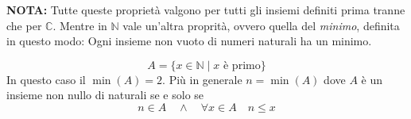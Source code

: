 \textbf{NOTA:} Tutte queste propriet\`a valgono per tutti gli insiemi definiti prima tranne che per $\mathbb{C}$. Mentre
in $\mathbb{N}$ vale un'altra proprit\`a, ovvero quella del \emph{minimo}, definita in questo modo: Ogni insieme non
vuoto di numeri naturali ha un minimo.

\begin{example}
	\[ A = \{x \in \mathbb{N} \mid \text{$x$ \`e primo}\} \]
	In questo caso il $\min({A}) = 2$. Pi\`u in generale $n = \min({A})$ dove $A$ \`e un insieme non nullo di naturali
	se e solo se
	\[ n \in A \quad \wedge \quad \forall x \in A \quad n \leq x \]
\end{example}